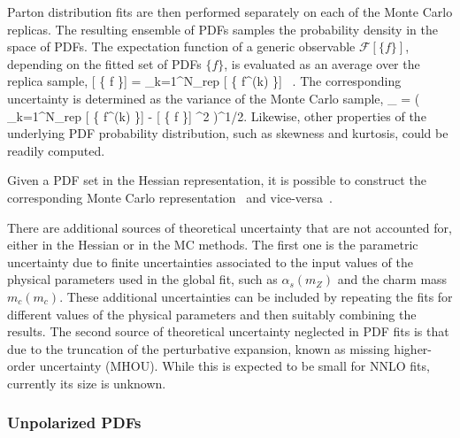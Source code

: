 Parton distribution fits are then performed separately on each of the 
Monte Carlo replicas.
%
The resulting ensemble of PDFs samples the probability density in the space
of PDFs.
%
The expectation function of a generic observable $ \mathcal{F} [ \{  f \}]$,
depending on the fitted set of PDFs $\{f\}$,
is evaluated as an average over the replica sample,
\be
\label{masterave}
\la {} [ \{  f \}] \ra
=  \sum_{k=1}^{N_{\rm rep}}
 [ \{  f^{(k)} \}] \, .
\ee
The corresponding uncertainty is determined as the variance of the
Monte Carlo sample,
\be
\sigma_{} =
\left( 
\sum_{k=1}^{N_{\rm rep}}   
\lp {} [ \{  f^{(k)} \}] 
-   \la {} [ \{  f \}] \ra\rp^2 
 \right)^{1/2}.
\label{mastersig}
\ee
Likewise, other properties of the underlying PDF probability distribution, 
such as skewness and kurtosis, could be readily computed.


Given a PDF set in the Hessian representation, it is possible to construct
the corresponding Monte Carlo representation~\cite{Watt:2012tq,Hou:2016sho}
and vice-versa~\cite{Gao:2013bia,Carrazza:2015aoa}.

There are additional sources of theoretical uncertainty that are not accounted 
for, either in the Hessian or in the MC methods.
%
The first one is the parametric uncertainty due to finite uncertainties 
associated to the input values of the physical parameters used in the global 
fit, such as $\alpha_s(m_Z)$ and the charm mass $m_c(m_c)$.
%
These additional uncertainties can be included by repeating the fits for 
different values of the physical parameters and then suitably combining 
the results.
%
The second source of theoretical uncertainty neglected in PDF fits
is that due to the truncation of the perturbative expansion, known
as missing higher-order uncertainty (MHOU).
%
While this is expected to be small for NNLO fits, currently its size is unknown.


\subsubsection{Unpolarized PDFs}
\label{sec:unpPDFs}

